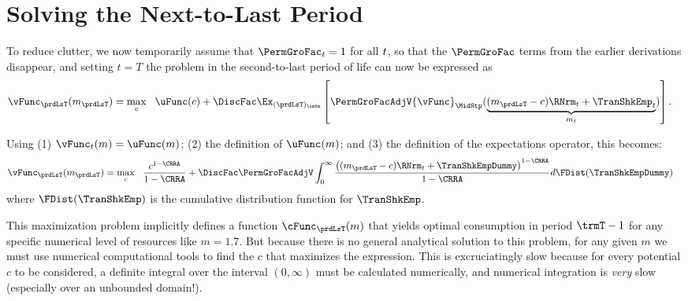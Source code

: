 
\hypertarget{solving-the-next-to-last-period}{}
\hypertarget{solving-the-next}{}
\section{Solving the Next-to-Last Period}\label{sec:solving-the-next}

\renewcommand{\cLsT}{c}

To reduce clutter, we now temporarily assume that $\PermGroFac_{\prd}=1$ for all $t$, so that the $\PermGroFac$ terms from the earlier derivations disappear, and setting $t=T$ the problem in the second-to-last period of life can now be expressed as
\begin{equation*}\begin{gathered}\begin{aligned}
      {\vFunc}_{\prdLsT}({m}_{\prdLsT})  & = \max_{\cLsT} ~~ \uFunc(\cLsT) +
      \DiscFac \Ex_{({\prdLsT})_\cntn} \left[\PermGroFacAdjV{\vFunc}_{\MidStp}(\underbrace{({m}_{\prdLsT}-\cLsT)\RNrm_{\prdT} + \TranShkEmp_{\prdT}}_{{m}_{\prdT}})\right].
    \end{aligned}\end{gathered}\end{equation*}

Using (1) $\vFunc_{\prdT}({m})=\uFunc({m})$; (2) the definition of $\uFunc({m})$; and (3) the definition of the expectations operator, this becomes: %
\begin{equation*}\begin{gathered}\begin{aligned}
      {\vFunc}_{\prdLsT}({m}_{\prdLsT})   & = \max_{\cLsT} ~~
      \frac{\cLsT^{1-\CRRA}}{1-\CRRA} + \DiscFac \PermGroFacAdjV\int_{0}^{\infty}
      \frac{\left(({m}_{\prdLsT}-\cLsT)\RNrm_{\prdT}+ \TranShkEmpDummy\right)^{1-\CRRA}}{1-\CRRA}
      d\FDist(\TranShkEmpDummy)
    \end{aligned}\end{gathered}\end{equation*}
where $\FDist(\TranShkEmp)$ is the cumulative distribution function for ${\TranShkEmp}$.

\lstset{basicstyle=\ttfamily\footnotesize,breaklines=true,language=Python,frame=single}


This maximization problem implicitly defines a function $\cFunc_{\prdLsT}({m})$ that yields optimal consumption in period $\trmT-1$ for any specific numerical level of resources like ${m}=1.7$.  But because there is no general analytical solution to this problem, for any given ${m}$ we must use numerical computational tools to find the $\cLsT$ that maximizes the expression.  This is excruciatingly slow because for every potential ${c}$ to be considered, a definite integral over the interval $(0,\infty)$ must be calculated numerically, and numerical integration is \textit{very} slow (especially over an unbounded domain!).

